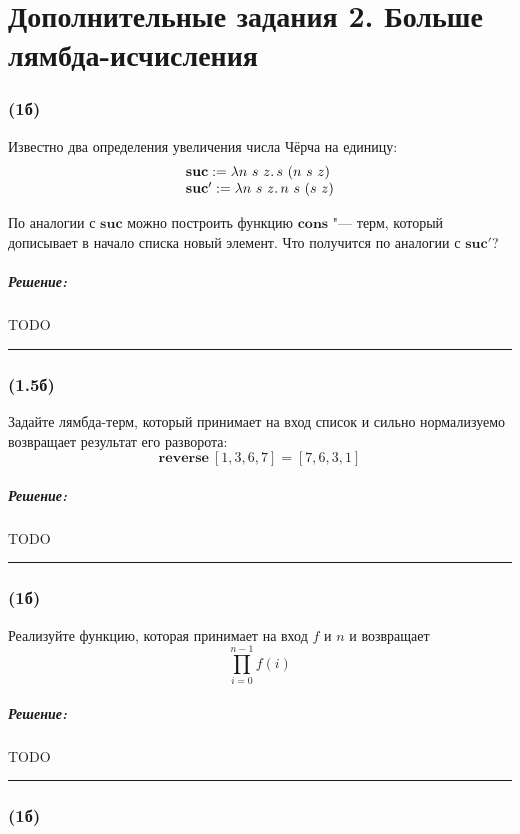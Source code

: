 \documentclass{article}
\newenvironment{proof}{\subparagraph{\hspace{-1em}Решение:\newline}}{\par\noindent\rule{\textwidth}{0.4pt}}
\begin{document}
    \section*{Дополнительные задания 2. Больше лямбда-исчисления}

    \subsubsection{(1б)}

    Известно два определения увеличения числа Чёрча на единицу:
    $$\begin{array}{l}
        \mathbf{suc} := \lambda n~s~z\ldotp s~(n~s~z) \\
        \mathbf{suc'} := \lambda n~s~z\ldotp n~s~(s~z) \\
    \end{array}$$
    
    По аналогии с $\mathbf{suc}$ можно
    построить функцию $\mathbf{cons}$ "--- терм, который дописывает в начало
    списка новый элемент. Что получится по аналогии с $\mathbf{suc'}$?

    \begin{proof}
        TODO %
    \end{proof}

    \subsubsection{(1.5б)}

    Задайте лямбда-терм, который принимает на вход список и сильно
    нормализуемо возвращает результат его разворота:
    $$\mathbf{reverse}~[1, 3, 6, 7] = [7, 6, 3, 1]$$

    \begin{proof}
        TODO %
    \end{proof}

    \subsubsection{(1б)}

    Реализуйте функцию, которая принимает на вход $f$ и $n$ и возвращает
    $$\prod_{i = 0}^{n-1} f(i)$$

    \begin{proof}
        TODO %
    \end{proof}

    \subsubsection{(1б)}
\end{document}
